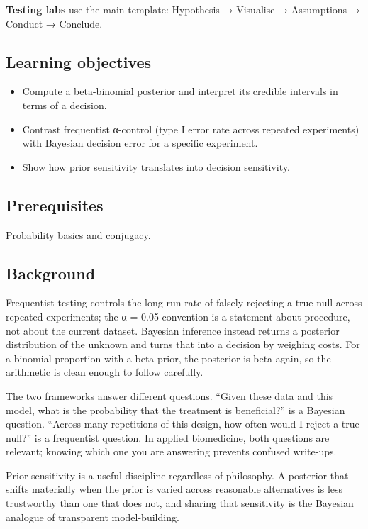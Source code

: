 \documentclass[
]{article}
\author{}
\date{\vspace{-2.5em}}
\providecommand{\tightlist}{%
  \setlength{\itemsep}{0pt}\setlength{\parskip}{0pt}}
\begin{document}
\textbf{Testing labs} use the main template: Hypothesis → Visualise →
Assumptions → Conduct → Conclude.

\subsection{Learning objectives}\label{learning-objectives}

\begin{itemize}
\tightlist
\item
  Compute a beta-binomial posterior and interpret its credible intervals
  in terms of a decision.
\item
  Contrast frequentist α-control (type I error rate across repeated
  experiments) with Bayesian decision error for a specific experiment.
\item
  Show how prior sensitivity translates into decision sensitivity.
\end{itemize}

\subsection{Prerequisites}\label{prerequisites}

Probability basics and conjugacy.

\subsection{Background}\label{background}

Frequentist testing controls the long-run rate of falsely rejecting a
true null across repeated experiments; the α = 0.05 convention is a
statement about procedure, not about the current dataset. Bayesian
inference instead returns a posterior distribution of the unknown and
turns that into a decision by weighing costs. For a binomial proportion
with a beta prior, the posterior is beta again, so the arithmetic is
clean enough to follow carefully.

The two frameworks answer different questions. ``Given these data and
this model, what is the probability that the treatment is beneficial?''
is a Bayesian question. ``Across many repetitions of this design, how
often would I reject a true null?'' is a frequentist question. In
applied biomedicine, both questions are relevant; knowing which one you
are answering prevents confused write-ups.

Prior sensitivity is a useful discipline regardless of philosophy. A
posterior that shifts materially when the prior is varied across
reasonable alternatives is less trustworthy than one that does not, and
sharing that sensitivity is the Bayesian analogue of transparent
model-building.
\end{document}
